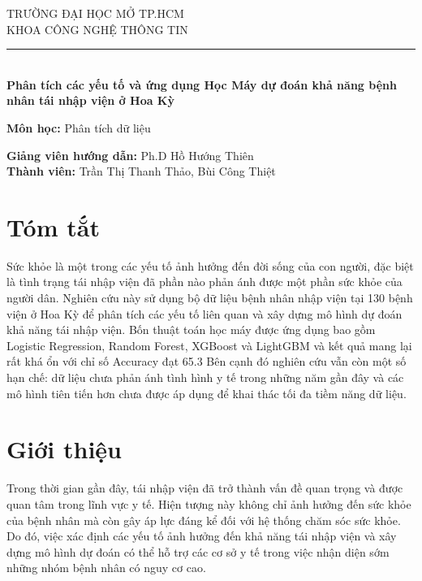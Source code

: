 \documentclass[12pt]{report} %
\begin{document}
\begin{center}
    \large TRƯỜNG ĐẠI HỌC MỞ TP.HCM\\
    KHOA CÔNG NGHỆ THÔNG TIN\\[0.2em]
    \rule{0.4\textwidth}{0.4pt}\\[1cm]
    
    \LARGE\textbf{Phân tích các yếu tố và ứng dụng Học Máy dự đoán khả năng bệnh nhân tái nhập viện ở Hoa Kỳ}
\end{center}

\vspace{0.25cm}

\begin{center}
\textbf{Môn học:} Phân tích dữ liệu\\
\end{center}
\textbf{Giảng viên hướng dẫn:} Ph.D Hồ Hướng Thiên\\
\textbf{Thành viên:} Trần Thị Thanh Thảo, Bùi Công Thiệt



\section*{Tóm tắt}

Sức khỏe là một trong các yếu tố ảnh hưởng đến đời sống của con người, đặc biệt là tình trạng tái nhập viện đã phần nào phản ánh được một phần sức khỏe của người dân.
Nghiên cứu này sử dụng bộ dữ liệu bệnh nhân nhập viện tại 130 bệnh viện ở Hoa Kỳ để phân tích các yếu tố liên quan và xây dựng mô hình dự đoán khả năng tái nhập viện.
Bốn thuật toán học máy được ứng dụng bao gồm Logistic Regression, Random Forest, XGBoost và LightGBM và kết quả mang lại rất khá ổn với chỉ số Accuracy đạt 65.3%
Bên cạnh đó nghiên cứu vẫn còn một số hạn chế: dữ liệu chưa phản ánh tình hình y tế trong những năm gần đây và các mô hình tiên tiến hơn chưa được áp dụng để khai thác tối đa tiềm năng dữ liệu.

\section*{Giới thiệu}

Trong thời gian gần đây, tái nhập viện đã trở thành vấn đề quan trọng và được quan tâm trong lĩnh vực y tế. Hiện tượng này không chỉ
ảnh hưởng đến sức khỏe của bệnh nhân mà còn gây áp lực đáng kể đối với
hệ thống chăm sóc sức khỏe. Do đó, việc xác định các yếu tố ảnh hưởng đến khả năng tái nhập viện và xây dựng mô hình dự đoán có thể hỗ trợ các cơ sở y tế trong việc nhận diện sớm những nhóm bệnh nhân có nguy cơ cao.
\end{document}
